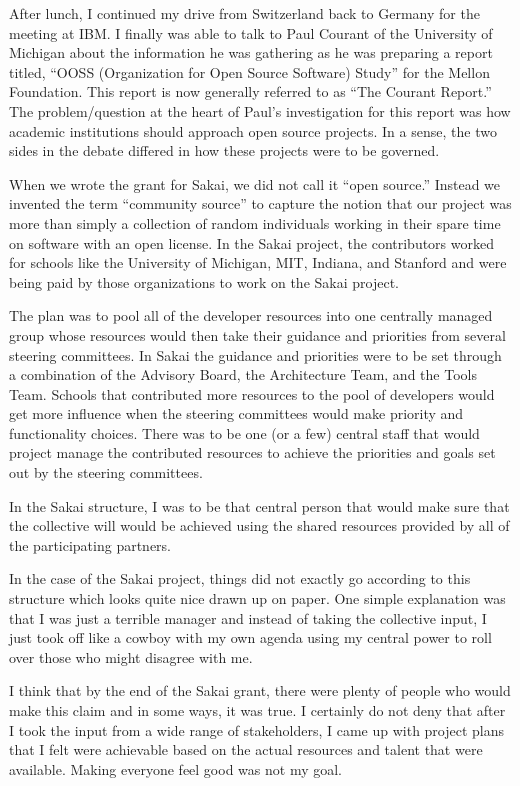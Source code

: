 \documentclass[12pt]{book}
\begin{document}
After lunch, I continued my drive from Switzerland back to Germany
for the meeting at IBM.  I finally was able to talk to Paul Courant of
the University of Michigan about the information he was gathering as he was
preparing a report titled, ``OOSS (Organization for Open Source Software) Study''
for the Mellon Foundation.   This report is now generally referred to as
``The Courant Report.''
The problem\slash question at the heart of Paul's investigation for this report
was how academic institutions should approach open source projects.  In a
sense, the two sides in the debate differed in how these projects were to be
governed.

When we wrote the grant for Sakai, we did not call it ``open source.''
Instead we invented the term ``community source'' to capture
the notion that our project was more than simply a collection
of random individuals working in their spare time on software with an
open license.  In the Sakai project, the contributors worked for
schools like the University of Michigan, MIT, Indiana, and Stanford
and were being paid by those organizations to work on the Sakai project.

The plan was to pool all of the developer resources into one centrally
managed group whose resources would then take their guidance and
priorities from several steering committees.  In Sakai the guidance
and priorities were to be set through a combination of the Advisory
Board, the Architecture Team, and the Tools Team.   Schools that
contributed more resources to the pool of developers would get more
influence when the steering committees would make priority and
functionality choices.  There was to be one (or a few) central staff
that would project manage the contributed resources to achieve
the priorities and goals set out by the steering committees.

In the Sakai structure, I was to be that central person that would
make sure that the collective will would be achieved using the shared
resources provided by all of the participating partners.

In the case of the Sakai project, things did not exactly go according to
this structure which looks quite nice drawn up on paper.  One simple
explanation was that I was just a terrible manager and instead of
taking the collective input, I just took off like a cowboy with
my own agenda using my central power to roll over those who might
disagree with me.

I think that by the end of the Sakai grant, there
were plenty of people who would make this claim and in some ways, it
was true.  I certainly do not deny that after I took the input from
a wide range of stakeholders, I came up with project plans that
I felt were achievable based on the actual resources and talent
that were available.  Making everyone feel good was not my goal.
\end{document}
